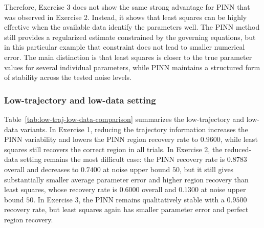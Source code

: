 \documentclass[11pt]{article}
\begin{document}
Therefore, Exercise 3 does not show the same strong advantage for PINN that was observed in Exercise 2. Instead, it shows that least squares can be highly effective when the available data identify the parameters well. The PINN method still provides a regularized estimate constrained by the governing equations, but in this particular example that constraint does not lead to smaller numerical error. The main distinction is that least squares is closer to the true parameter values for several individual parameters, while PINN maintains a structured form of stability across the tested noise levels.

\subsubsection{Low-trajectory and low-data setting}

Table~\ref{tab:low-traj-low-data-comparison} summarizes the low-trajectory and low-data variants. In Exercise 1, reducing the trajectory information increases the PINN variability and lowers the PINN region recovery rate to \(0.9600\), while least squares still recovers the correct region in all trials. In Exercise 2, the reduced-data setting remains the most difficult case: the PINN recovery rate is \(0.8783\) overall and decreases to \(0.7400\) at noise upper bound \(50\), but it still gives substantially smaller average parameter error and higher region recovery than least squares, whose recovery rate is \(0.6000\) overall and \(0.1300\) at noise upper bound \(50\). In Exercise 3, the PINN remains qualitatively stable with a \(0.9500\) recovery rate, but least squares again has smaller parameter error and perfect region recovery.
\end{document}
